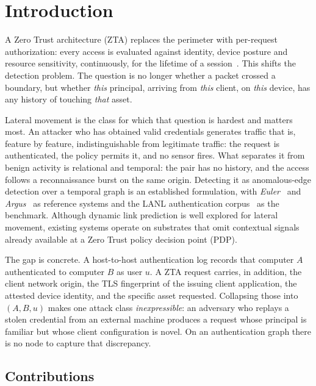 \section{Introduction}
\label{sec:intro}

A Zero Trust architecture (ZTA) replaces the perimeter with per-request
authorization: every access is evaluated against identity, device posture and
resource sensitivity, continuously, for the lifetime of a session~\cite{nist800207}.
This shifts the detection problem. The question is no longer whether a packet crossed
a boundary, but whether \emph{this} principal, arriving from \emph{this} client, on
\emph{this} device, has any history of touching \emph{that} asset.

Lateral movement is the class for which that question is hardest and matters most. An
attacker who has obtained valid credentials generates traffic that is, feature by
feature, indistinguishable from legitimate traffic: the request is authenticated, the
policy permits it, and no sensor fires. What separates it from benign activity is
relational and temporal: the pair has no history, and the access follows a
reconnaissance burst on the same origin. Detecting it as anomalous-edge detection over
a temporal graph is an established formulation, with \textit{Euler}~\cite{euler} and \textit{Argus}~\cite{argus} as reference systems and the LANL authentication
corpus~\cite{lanl} as the benchmark. Although dynamic link prediction is well explored
for lateral movement, existing systems operate on substrates that omit contextual signals
already available at a Zero Trust policy decision point (PDP).

The gap is concrete. A host-to-host authentication log records that computer $A$
authenticated to computer $B$ as user $u$. A ZTA request carries, in addition, the
client network origin, the TLS fingerprint of the issuing client application, the
attested device identity, and the specific asset requested. Collapsing those into
$(A, B, u)$ makes one attack class \emph{inexpressible}: an adversary who replays a
stolen credential from an external machine produces a request whose principal is
familiar but whose client configuration is novel. On an authentication graph there is
no node to capture that discrepancy.

\subsection*{Contributions}

